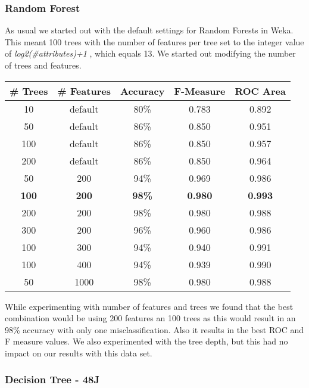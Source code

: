 \documentclass{sig-alternate-05-2015}
\begin{document}
{\subsubsection{Random Forest}
As usual we started out with the default settings for Random Forests in Weka. This meant 100 trees with the number of features per tree set to the integer value of \emph{log2(\#attributes)+1} , which equals 13. We started out modifying the number of trees and features.
\begin{center}
\begin{tabular}{ c | c | c | c | c }
\textbf{\# Trees} & \textbf{\# Features} & \textbf{Accuracy} & \textbf{F-Measure} & \textbf{ROC Area}\\
\hline
10 & default & 80\% & 0.783 & 0.892\\
50 & default & 86\% & 0.850 & 0.951\\
100 & default & 86\% & 0.850 & 0.957\\
200 & default & 86\% & 0.850 & 0.964\\
50 & 200 & 94\% & 0.969 & 0.986\\
\textbf{100} & \textbf{200} & \textbf{98\%} & \textbf{0.980} & \textbf{0.993}\\
200 & 200 & 98\% & 0.980 & 0.988\\
300 & 200 & 96\% & 0.960 & 0.986\\
100 & 300 & 94\% & 0.940 & 0.991\\
100 & 400 & 94\% & 0.939 & 0.990\\
50 & 1000 & 98\% & 0.980 & 0.988\\

\end{tabular}
\end{center}

While experimenting with number of features and trees we found that the best combination would be using 200 features an 100 trees as this would result in an 98\% accuracy with only one misclassification. Also it results in the best ROC and F measure values. We also experimented with the tree depth, but this had no impact on our results with this data set.

\subsubsection{Decision Tree - 48J}

}
\end{document}

